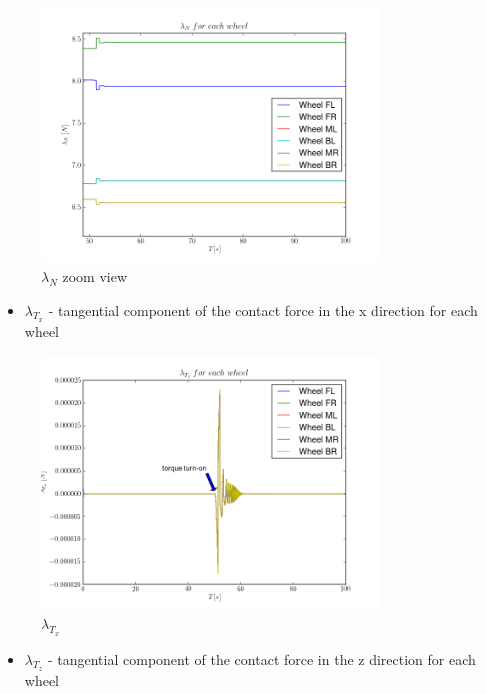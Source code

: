 \begin{figure}[H]
  \centering
    \includegraphics[width=0.8\textwidth]{lambdaN2steady}
  \caption{$\lambda_{N}$ zoom view}
\end{figure}

\begin{itemize}
  \item $\lambda_{T_x}$ - tangential component of the contact force in the x direction for each wheel
\end{itemize}

\begin{figure}[H]
  \centering
    \includegraphics[width=0.8\textwidth]{lambdaTx2}
  \caption{$\lambda_{T_x}$}
\end{figure}

\begin{itemize}
  \item $\lambda_{T_z}$ - tangential component of the contact force in the z direction for each wheel
\end{itemize}

